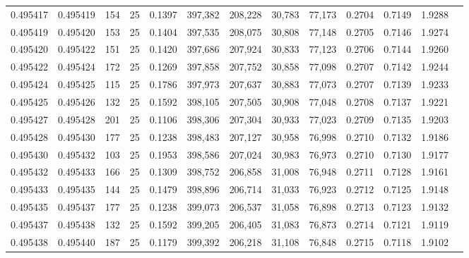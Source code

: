 \begin{tabular}{rrrrrrrrrrrrr}
0.495417 & 0.495419 &   154 &  25 &                                     0.1397 & 397,382 & 208,228 &  30,783 &  77,173 & 0.2704 & 0.7149 & 1.9288 \\
0.495419 & 0.495420 &   153 &  25 &                                     0.1404 & 397,535 & 208,075 &  30,808 &  77,148 & 0.2705 & 0.7146 & 1.9274 \\
0.495420 & 0.495422 &   151 &  25 &                                     0.1420 & 397,686 & 207,924 &  30,833 &  77,123 & 0.2706 & 0.7144 & 1.9260 \\
0.495422 & 0.495424 &   172 &  25 &                                     0.1269 & 397,858 & 207,752 &  30,858 &  77,098 & 0.2707 & 0.7142 & 1.9244 \\
0.495424 & 0.495425 &   115 &  25 &                                     0.1786 & 397,973 & 207,637 &  30,883 &  77,073 & 0.2707 & 0.7139 & 1.9233 \\
0.495425 & 0.495426 &   132 &  25 &                                     0.1592 & 398,105 & 207,505 &  30,908 &  77,048 & 0.2708 & 0.7137 & 1.9221 \\
0.495427 & 0.495428 &   201 &  25 &                                     0.1106 & 398,306 & 207,304 &  30,933 &  77,023 & 0.2709 & 0.7135 & 1.9203 \\
0.495428 & 0.495430 &   177 &  25 &                                     0.1238 & 398,483 & 207,127 &  30,958 &  76,998 & 0.2710 & 0.7132 & 1.9186 \\
0.495430 & 0.495432 &   103 &  25 &                                     0.1953 & 398,586 & 207,024 &  30,983 &  76,973 & 0.2710 & 0.7130 & 1.9177 \\
0.495432 & 0.495433 &   166 &  25 &                                     0.1309 & 398,752 & 206,858 &  31,008 &  76,948 & 0.2711 & 0.7128 & 1.9161 \\
0.495433 & 0.495435 &   144 &  25 &                                     0.1479 & 398,896 & 206,714 &  31,033 &  76,923 & 0.2712 & 0.7125 & 1.9148 \\
0.495435 & 0.495437 &   177 &  25 &                                     0.1238 & 399,073 & 206,537 &  31,058 &  76,898 & 0.2713 & 0.7123 & 1.9132 \\
0.495437 & 0.495438 &   132 &  25 &                                     0.1592 & 399,205 & 206,405 &  31,083 &  76,873 & 0.2714 & 0.7121 & 1.9119 \\
0.495438 & 0.495440 &   187 &  25 &                                     0.1179 & 399,392 & 206,218 &  31,108 &  76,848 & 0.2715 & 0.7118 & 1.9102 \\

\end{tabular}
